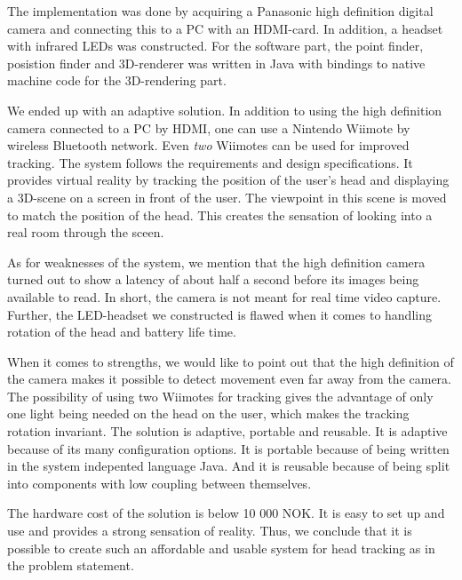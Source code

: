 The implementation was done by acquiring a Panasonic high definition digital camera and connecting this to a PC with an HDMI-card. In addition, a headset with infrared LEDs was constructed. For the software part, the point finder, posistion finder and 3D-renderer was written in Java with bindings to native machine code for the 3D-rendering part.

We ended up with an adaptive solution. In addition to using the high definition camera connected to a PC by HDMI, one can use a Nintendo Wiimote by wireless Bluetooth network. Even {\em two} Wiimotes can be used for improved tracking. The system follows the requirements and design specifications. It provides virtual reality by tracking the position of the user's head and displaying a 3D-scene on a screen in front of the user. The viewpoint in this scene is moved to match the position of the head. This creates the sensation of looking into a real room through the sceen.

As for weaknesses of the system, we mention that the high definition camera turned out to show a latency of about half a second before its images being available to read. In short, the camera is not meant for real time video capture. Further, the LED-headset we constructed is flawed when it comes to handling rotation of the head and battery life time.

When it comes to strengths, we would like to point out that the high definition of the camera makes it possible to detect movement even far away from the camera. The possibility of using two Wiimotes for tracking gives the advantage of only one light being needed on the head on the user, which makes the tracking rotation invariant. The solution is adaptive, portable and reusable. It is adaptive because of its many configuration options. It is portable because of being written in the system indepented language Java. And it is reusable because of being split into components with low coupling between themselves.

The hardware cost of the solution is below 10 000 NOK. It is easy to set up and use and provides a strong sensation of reality. Thus, we conclude that it is possible to create such an affordable and usable system for head tracking as in the problem statement.